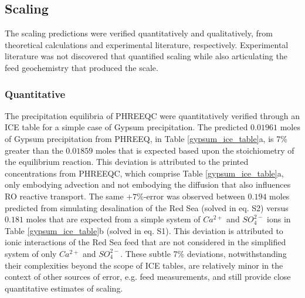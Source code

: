\documentclass[journal=ACSES&TWater,manuscript=article]{achemso}
\begin{document}
\subsection{Scaling}
The scaling predictions were verified quantitatively and qualitatively, from theoretical calculations and experimental literature, respectively. Experimental literature was not discovered that quantified scaling while also articulating the feed geochemistry that produced the scale. 

\subsubsection{Quantitative}
The precipitation equilibria of PHREEQC were quantitatively verified through an ICE table for a simple case of Gypsum precipitation. The predicted $0.01961$ moles of Gypsum precipitation from PHREEQ, in Table \ref{gypsum_ice_table}a, is 7\% greater than the $0.01859$ moles that is expected based upon the stoichiometry of the equilibrium reaction. This deviation is attributed to the printed concentrations from PHREEQC, which comprise Table \ref{gypsum_ice_table}a, only embodying advection and not embodying the diffusion that also influences RO reactive transport. The same $+7\%$-error was observed between $0.194$ moles predicted from simulating desalination of the Red Sea (solved in eq. S2) versus $0.181$ moles that are expected from a simple system of $Ca^{2+}$ and $SO_4^{2-}$ ions in Table \ref{gypsum_ice_table}b (solved in eq. S1). This deviation is attributed to ionic interactions of the Red Sea feed that are not considered in the simplified system of only $Ca^{2+}$ and $SO_4^{2-}$. These subtle 7\% deviations, notwithstanding their complexities beyond the scope of ICE tables, are relatively minor in the context of other sources of error, e.g. feed measurements, and still provide close quantitative estimates of scaling.
\end{document}
